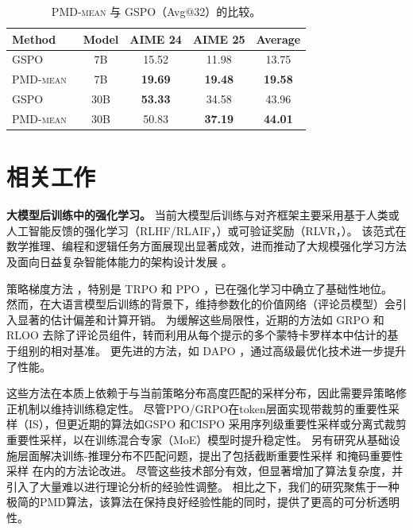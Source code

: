\documentclass{article}
\theoremstyle{plain}
\theoremstyle{definition}
\theoremstyle{remark}
\newcommand{\pmdmean}{\textsc{PMD-mean}}
\begin{document}
\begin{table}[htb!]
    \caption{\textsc{PMD-mean} 与 GSPO（Avg@32）的比较。 }
    \label{tab:gspo}
    \begin{center}\small
                \begin{tabular}{lcccc}
                \toprule
                \textbf{Method} & \textbf{Model} & \textbf{AIME 24} & \textbf{AIME 25} & \textbf{Average} \\
                \midrule
                GSPO & 7B & 15.52 & 11.98 & 13.75 \\
                \pmdmean\ & 7B & \textbf{19.69} & \textbf{19.48} & \textbf{19.58} \\
                \midrule
                GSPO & 30B & \textbf{53.33} & 34.58 & {43.96} \\
                \pmdmean\ & 30B & {50.83} & \textbf{37.19} & \textbf{44.01} \\
                \bottomrule
                \end{tabular}
    \end{center}
\end{table}

\section{相关工作}
\label{sec:related}

\textbf{大模型后训练中的强化学习。}
当前大模型后训练与对齐框架主要采用基于人类或人工智能反馈的强化学习（RLHF/RLAIF，\citealt{ziegler2019fine,ouyang2022training,bai2022constitutional}）或可验证奖励（RLVR，\citealt{lambert2024tulu}）。
该范式在数学推理、编程和逻辑任务方面展现出显著成效，进而推动了大规模强化学习方法及面向日益复杂智能体能力的架构设计发展 \citep{jaech2024openai,guo2025deepseek,google2025gemini,team2025kimik20}。

策略梯度方法 \citep{williams1992simple,sutton1999policy}，特别是 TRPO 和 PPO \citep{schulman2015trust,schulman2017proximal}，已在强化学习中确立了基础性地位。  
然而，在大语言模型后训练的背景下，维持参数化的价值网络（评论员模型）会引入显著的估计偏差和计算开销。  
为缓解这些局限性，近期的方法如 GRPO \citep{shao2024deepseekmath} 和 RLOO \citep{ahmadian2024back} 去除了评论员组件，转而利用从每个提示的多个蒙特卡罗样本中估计的基于组别的相对基准。  
更先进的方法，如 DAPO \citep{yu2025dapo}，通过高级最优化技术进一步提升了性能。

这些方法在本质上依赖于与当前策略分布高度匹配的采样分布，因此需要异策略修正机制以维持训练稳定性。  
尽管PPO/GRPO在token层面实现带裁剪的重要性采样（IS），但更近期的算法如GSPO \citep{zheng2025group}和CISPO \citep{chen2025minimax}采用序列级重要性采样或分离式裁剪重要性采样，以在训练混合专家（MoE）模型时提升稳定性。  
另有研究从基础设施层面解决训练-推理分布不匹配问题，提出了包括截断重要性采样 \citep{yao2025offpolicy} 和掩码重要性采样 \citep{liu-li-2025-rl-collapse} 在内的方法论改进。  
尽管这些技术部分有效，但显著增加了算法复杂度，并引入了大量难以进行理论分析的经验性调整。  
相比之下，我们的研究聚焦于一种极简的PMD算法，该算法在保持良好经验性能的同时，提供了更高的可分析透明性。
\end{document}
